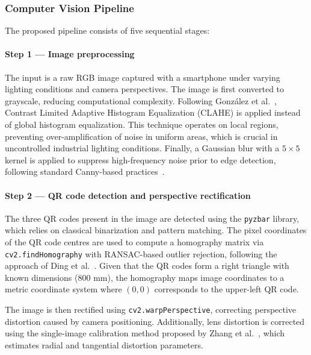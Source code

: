 \documentclass[11pt]{article}
\begin{document}
\subsubsection{Computer Vision Pipeline}

The proposed pipeline consists of five sequential stages:

\paragraph{Step 1 --- Image preprocessing}
The input is a raw RGB image captured with a smartphone under varying lighting conditions and camera perspectives. The image is first converted to grayscale, reducing computational complexity. Following González et al.~\cite{Gonzalez2024}, Contrast Limited Adaptive Histogram Equalization (CLAHE) is applied instead of global histogram equalization. This technique operates on local regions, preventing over-amplification of noise in uniform areas, which is crucial in uncontrolled industrial lighting conditions. Finally, a Gaussian blur with a $5 \times 5$ kernel is applied to suppress high-frequency noise prior to edge detection, following standard Canny-based practices~\cite{Liu2024b}.

\paragraph{Step 2 --- QR code detection and perspective rectification}
The three QR codes present in the image are detected using the \texttt{pyzbar} library, which relies on classical binarization and pattern matching. The pixel coordinates of the QR code centres are used to compute a homography matrix via \texttt{cv2.findHomography} with RANSAC-based outlier rejection, following the approach of Ding et al.~\cite{Ding2025Homography}. Given that the QR codes form a right triangle with known dimensions (800 mm), the homography maps image coordinates to a metric coordinate system where $(0,0)$ corresponds to the upper-left QR code.

The image is then rectified using \texttt{cv2.warpPerspective}, correcting perspective distortion caused by camera positioning. Additionally, lens distortion is corrected using the single-image calibration method proposed by Zhang et al.~\cite{Zhang2024Calibration}, which estimates radial and tangential distortion parameters.
\end{document}
